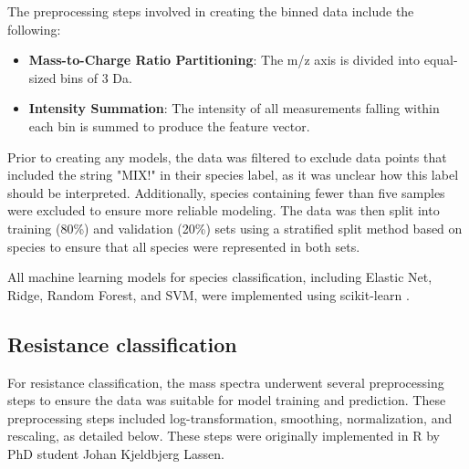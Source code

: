 \documentclass[english,11pt,a4paper,titlepage]{article}
\begin{document}
	The preprocessing steps involved in creating the binned data include the following:
	
	\begin{itemize}
		\item \textbf{Mass-to-Charge Ratio Partitioning}: The m/z axis is divided into equal-sized bins of 3 Da.
		\item \textbf{Intensity Summation}: The intensity of all measurements falling within each bin is summed to produce the feature vector.
	\end{itemize}
	
	Prior to creating any models, the data was filtered to exclude data points that included the string "MIX!" in their species label, as it was unclear how this label should be interpreted. Additionally, species containing fewer than five samples were excluded to ensure more reliable modeling. The data was then split into training (80\%) and validation (20\%) sets using a stratified split method based on species to ensure that all species were represented in both sets.
	
	All machine learning models for species classification, including Elastic Net, Ridge, Random Forest, and SVM, were implemented using scikit-learn \cite{scikit-learn}.
	
	\subsection*{Resistance classification}
	For resistance classification, the mass spectra underwent several preprocessing steps to ensure the data was suitable for model training and prediction. These preprocessing steps included log-transformation, smoothing, normalization, and rescaling, as detailed below. These steps were originally implemented in R by PhD student Johan Kjeldbjerg Lassen.
	
\end{document}
